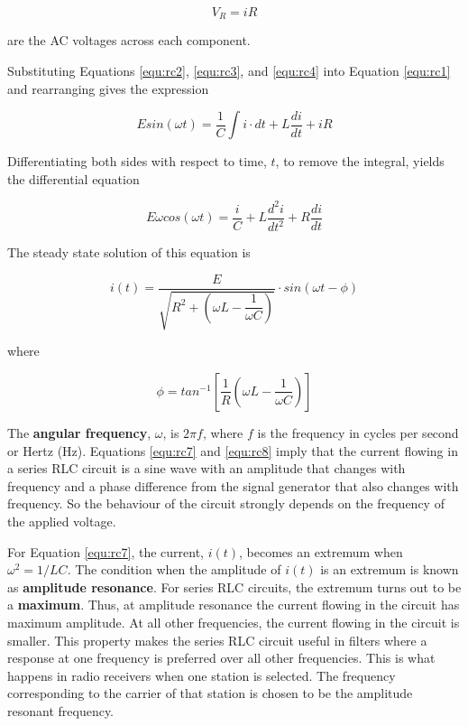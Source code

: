 \begin{equation}
V_R=iR
\label{equ:rc4}
\end{equation}

\noindent are the AC voltages across each component.

Substituting Equations \ref{equ:rc2}, \ref{equ:rc3}, and \ref{equ:rc4} into Equation \ref{equ:rc1} and rearranging gives the expression

\begin{equation}
Esin(\omega t)=\dfrac{1}{C}\int i\cdot dt +L\dfrac{di}{dt}+iR
\label{equ:rc5}
\end{equation}

Differentiating both sides with respect to time, $t$, to remove the integral, yields the differential equation


\begin{equation}
E\omega cos(\omega t)=\dfrac{i}{C}+L\dfrac{d^2i}{dt^2}+R\dfrac{di}{dt}
\label{equ:rc6}
\end{equation}

\noindent The steady state solution of this equation is


\begin{equation}
i(t)=\dfrac{E}{\sqrt{R^2+\left(\omega L-\dfrac{1}{\omega C}\right)}}\cdot sin(\omega t-\phi)
\label{equ:rc7}
\end{equation}

\noindent where


\begin{equation}
\phi=tan^{-1}\left[\dfrac{1}{R}\left(\omega L-\dfrac{1}{\omega C}\right)\right]
\label{equ:rc8}
\end{equation}

The {\bf angular frequency}, $\omega$, is $2\pi f$, where $f$ is the frequency in cycles per second or Hertz (Hz). Equations \ref{equ:rc7} and \ref{equ:rc8} imply that the current flowing in a series RLC circuit is a sine wave with an amplitude that changes with frequency and a phase difference from the signal generator that also changes with frequency. So the behaviour of the circuit strongly depends on the frequency of the applied voltage.

For Equation \ref{equ:rc7}, the current, $i(t)$, becomes an extremum when $\omega^2 = 1/LC$. The condition when the amplitude of $i(t)$ is an extremum is known as {\bf amplitude resonance}. For series RLC circuits, the extremum turns out to be a {\bf maximum}. Thus, at amplitude resonance the current flowing in the circuit has maximum amplitude. At all other frequencies, the current flowing in the circuit is smaller. This property makes the series RLC circuit useful in filters where a response at one frequency is preferred over all other frequencies. This is what happens in radio receivers when one station is selected. The frequency corresponding to the carrier of that station is chosen to be the amplitude resonant frequency.

